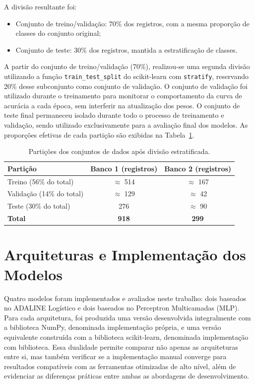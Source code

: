 A divisão resultante foi:

\begin{itemize}
    \item Conjunto de treino/validação: 70\% dos registros, com a mesma proporção de classes do conjunto original;
    \item Conjunto de teste: 30\% dos registros, mantida a estratificação de classes.
\end{itemize}

A partir do conjunto de treino/validação (70\%), realizou-se uma segunda divisão utilizando a função \texttt{train\_test\_split} do scikit-learn com \texttt{stratify}, reservando 20\% desse subconjunto como conjunto de validação. O conjunto de validação foi utilizado durante o treinamento para monitorar o comportamento da curva de acurácia a cada época, sem interferir na atualização dos pesos. O conjunto de teste final permaneceu isolado durante todo o processo de treinamento e validação, sendo utilizado exclusivamente para a avaliação final dos modelos. As proporções efetivas de cada partição são exibidas na Tabela~\ref{tab:divisao_dados}.

\begin{table}[H]
\centering
\caption{Partições dos conjuntos de dados após divisão estratificada.}
\label{tab:divisao_dados}
\begin{tabular}{|l|c|c|}
\hline
\textbf{Partição} & \textbf{Banco 1 (registros)} & \textbf{Banco 2 (registros)} \\
\hline
Treino (56\% do total) & $\approx$ 514 & $\approx$ 167 \\
Validação (14\% do total) & $\approx$ 129 & $\approx$ 42 \\
Teste (30\% do total) & 276 & $\approx$ 90 \\
\hline
\textbf{Total} & \textbf{918} & \textbf{299} \\
\hline
\end{tabular}
\end{table}

\section{Arquiteturas e Implementação dos Modelos}
\label{sec:implementacao}

Quatro modelos foram implementados e avaliados neste trabalho: dois baseados no ADALINE Logístico e dois baseados no Perceptron Multicamadas (MLP). Para cada arquitetura, foi produzida uma versão desenvolvida integralmente com a biblioteca NumPy, denominada implementação própria, e uma versão equivalente construída com a biblioteca scikit-learn, denominada implementação com biblioteca. Essa dualidade permite comparar não apenas as arquiteturas entre si, mas também verificar se a implementação manual converge para resultados compatíveis com as ferramentas otimizadas de alto nível, além de evidenciar as diferenças práticas entre ambas as abordagens de desenvolvimento.

